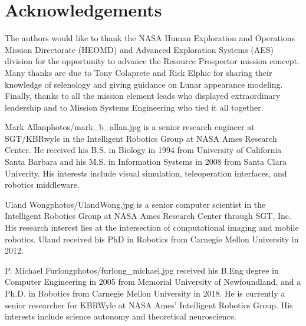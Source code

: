 \documentclass[twocolumn,letterpaper]{IEEEAerospaceCLS}  %
\begin{document}
\section{Acknowledgements}
The authors would like to thank the NASA Human Exploration and Operations Mission Directorate (HEOMD) and Advanced Exploration Systems (AES) division for the opportunity to advance the Resource Prospector mission concept.  Many thanks are due to Tony Colaprete and Rick Elphic for sharing their knowledge of selenology and giving guidance on Lunar appearance modeling.  Finally, thanks to all the mission element leads who displayed extraordinary leadership and to Mission Systems Engineering who tied it all together.  




\thebiography

\begin{biographywithpic}
{Mark Allan}{photos/mark_b_allan.jpg} is a senior research engineer at SGT/KBRwyle in the Intelligent Robotics Group at NASA Ames Research Center.  He received his B.S. in Biology in 1994 from University of California Santa Barbara and his M.S. in Information Systems in 2008 from Santa Clara Univerity.  His interests include visual simulation, teleoperation interfaces, and robotics middleware.
\end{biographywithpic} 


\begin{biographywithpic}
{Uland Wong}{photos/UlandWong.jpg} is a senior computer scientist in the Intelligent Robotics Group at NASA Ames Research Center through SGT, Inc.  His research interest lies at the intersection of computational imaging and mobile robotics.  Uland received his PhD in Robotics from Carnegie Mellon University in 2012. 
\end{biographywithpic} 

\begin{biographywithpic}
{P. Michael Furlong}{photos/furlong_michael.jpg} received his B.Eng degree in Computer Engineering in 2005 from Memorial University of Newfoundland, and a Ph.D. in Robotics from Carnegie Mellon University in 2018.  He is currently a senior researcher for KBRWyle at NASA Ames' Intelligent Robotics Group.  His interests include science autonomy and theoretical neuroscience.
\end{biographywithpic} 
\end{document}
